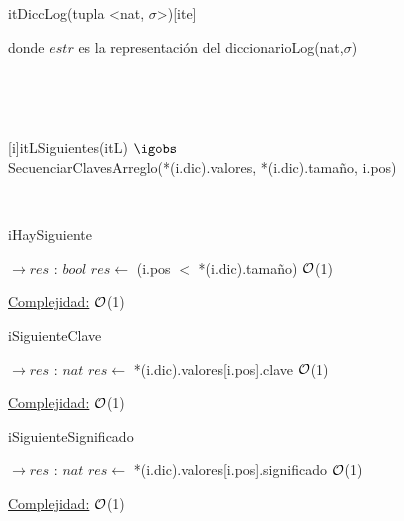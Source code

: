 \begin{Representacion}
	
	\begin{Estructura}{itDiccLog(tupla <nat, $\sigma$>)}[ite]
		\begin{Tupla}[ite]
		\end{Tupla}
	\tab \hspace{1.2mm}donde $estr$ es la representación del diccionarioLog(nat,$\sigma$)
	\end{Estructura}
		
~
	

~

	{itL}{Siguientes(itL) $\igobs$ \\
	SecuenciarClavesArreglo(*(i.dic).valores, *(i.dic).tamaño, i.pos)}
	
~

	
\end{Representacion}

\begin{Algoritmos}
	
	\begin{algorithm}[H]
		\caption{iHaySiguiente}
		\begin{algorithmic}
			 $\to res$ : $bool$
				\State $res \gets$ (i.pos $<$ *(i.dic).tamaño) \Comment $\mathcal{O}$(1)
			\EndProcedure
		\end{algorithmic}
		\underline{Complejidad:} $\mathcal{O}$(1)
	\end{algorithm}

	\begin{algorithm}[H]
		\caption{iSiguienteClave}
		\begin{algorithmic}
			 $\to res$ : $nat$
				\State $res \gets$ *(i.dic).valores[i.pos].clave \Comment $\mathcal{O}$(1)
			\EndProcedure
		\end{algorithmic}
		\underline{Complejidad:} $\mathcal{O}$(1)
	\end{algorithm}
	
	\begin{algorithm}[H]
		\caption{iSiguienteSignificado}
		\begin{algorithmic}
			 $\to res$ : $nat$
				\State $res \gets$ *(i.dic).valores[i.pos].significado \Comment $\mathcal{O}$(1)
			\EndProcedure
		\end{algorithmic}
		\underline{Complejidad:} $\mathcal{O}$(1)
	\end{algorithm}
	
\end{Algoritmos}